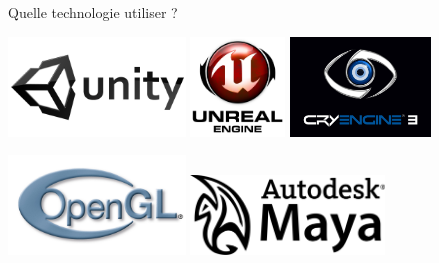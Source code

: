 \documentclass[a4paper,10pt]{beamer}
\begin{document}
	\begin{frame}{Quelle technologie utiliser ?}
		
		\centerline{\includegraphics[height=75pt]{images/techno/unity-logo.png}
			\includegraphics[height=75pt]{images/techno/UE3_logo.png}
			\includegraphics[height=75pt]{images/techno/CryENGINE3-Logo.png}}
		
		\centerline{\includegraphics[height=75pt]{images/techno/opengl-logo.jpg}
			\includegraphics[height=60pt]{images/techno/auto.png}}
	\end{frame}
	
\end{document}
